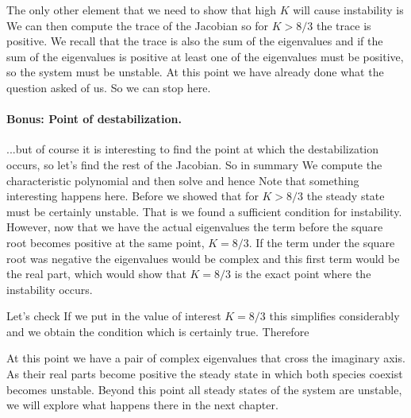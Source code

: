 The only other element that we need to show that high $K$ will cause instability is 
We can then compute the trace of the Jacobian 
so for $K>8/3$ the trace is positive. We recall that the trace is also the sum of the eigenvalues and if the sum of the eigenvalues is positive at least one of the eigenvalues must be positive, so the system must be unstable. At this point we have already done what the question asked of us. So we can stop here.

\paragraph{Bonus: Point of destabilization.}...but of course it is interesting to find the point at which the destabilization occurs, so let's find the rest of the Jacobian. 
So in summary 
We compute the characteristic polynomial 
and then solve 
and hence
Note that something interesting happens here. Before we showed that for $K>8/3$ the steady state must be certainly unstable. That is we found a sufficient condition for instability. However, now that we have the actual eigenvalues the term before the square root becomes positive at the same point, $K=8/3$. If the term under the square root was negative the eigenvalues would be complex and this first term would be the real part, which would show that $K=8/3$ is the exact point where the instability occurs. 

Let's check 
If we put in the value of interest $K=8/3$ this simplifies considerably and we obtain the condition 
which is certainly true. Therefore 

At this point we have a pair of complex eigenvalues that cross the imaginary axis. As their real parts become positive the steady state in which both species coexist becomes unstable. Beyond this point all steady states of the system are unstable, we will explore what happens there in the next chapter.  
